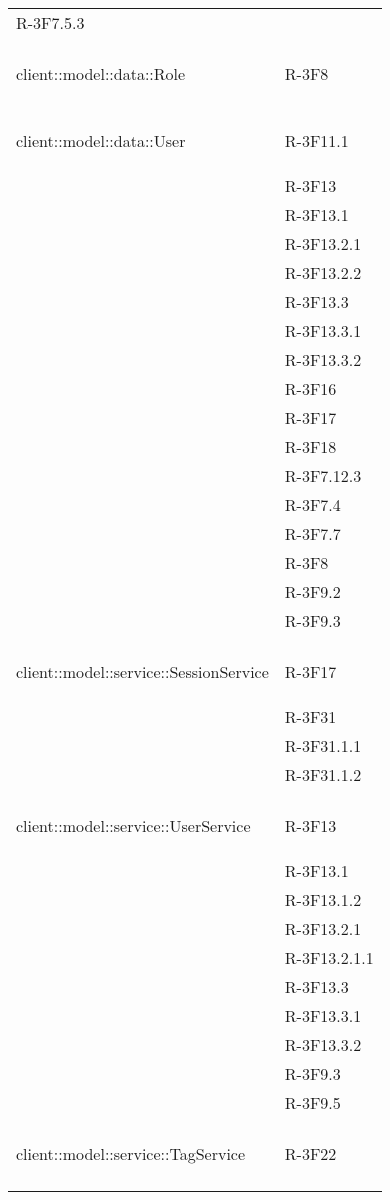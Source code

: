 \begin{longtable}{l p{3cm}}
	R-3F7.5.3 \tabularnewline &\tabularnewline
	\hline
	\hypertarget{client::model::data::Role}{client::model::data::Role} & R-3F8 \tabularnewline &\tabularnewline
	\hline
	\hypertarget{client::model::data::User}{client::model::data::User} & R-3F11.1 \tabularnewline &
	
	R-3F13 \tabularnewline &
	
	R-3F13.1 \tabularnewline &
	
	R-3F13.2.1 \tabularnewline &
	
	R-3F13.2.2 \tabularnewline &
	
	R-3F13.3 \tabularnewline &
	
	R-3F13.3.1 \tabularnewline &
	
	R-3F13.3.2 \tabularnewline &
	
	R-3F16 \tabularnewline &
	
	R-3F17 \tabularnewline &
	
	R-3F18 \tabularnewline &
	
	R-3F7.12.3 \tabularnewline &
	
	R-3F7.4 \tabularnewline &
	
	R-3F7.7 \tabularnewline &
	
	R-3F8 \tabularnewline &
	
	R-3F9.2 \tabularnewline &
	
	R-3F9.3 \tabularnewline &\tabularnewline
	\hline
	\hypertarget{client::model::service::SessionService}{client::model::service::SessionService} & R-3F17 \tabularnewline &
	
	R-3F31 \tabularnewline &
	
	R-3F31.1.1 \tabularnewline &
	
	R-3F31.1.2 \tabularnewline &\tabularnewline
	\hline
	\hypertarget{client::model::service::UserService}{client::model::service::UserService} & R-3F13 \tabularnewline &
	
	R-3F13.1 \tabularnewline &
	
	R-3F13.1.2 \tabularnewline &
	
	R-3F13.2.1 \tabularnewline &
	
	R-3F13.2.1.1 \tabularnewline &
	
	R-3F13.3 \tabularnewline &
	
	R-3F13.3.1 \tabularnewline &
	
	R-3F13.3.2 \tabularnewline &
	
	R-3F9.3 \tabularnewline &
	
	R-3F9.5 \tabularnewline &\tabularnewline
	\hline
	\hypertarget{client::model::service::TagService}{client::model::service::TagService} & R-3F22 \tabularnewline &
	

\end{longtable}
